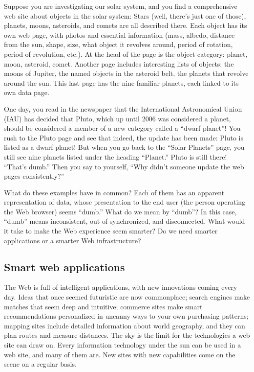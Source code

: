 Suppose you are investigating our solar system, and you find a
comprehensive web site about objects in the solar system: Stars (well,
there's just one of those), planets, moons, asteroids, and comets are
all described there. Each object has its own web page, with photos and
essential information (mass, albedo, distance from the sun, shape, size,
what object it revolves around, period of rotation, period of
revolution, etc.). At the head of the page is the object category:
planet, moon, asteroid, comet. Another page includes interesting lists
of objects: the moons of Jupiter, the named objects in the asteroid
belt, the planets that revolve around the sun. This last page has the
nine familiar planets, each linked to its own data page.

One day, you read in the newspaper that the International Astronomical
Union (IAU) has decided that Pluto, which up until 2006 was considered a
planet, should be considered a member of a new category called a ``dwarf
planet''! You rush to the Pluto page and see that indeed, the update has
been made: Pluto is listed as a dwarf planet! But when you go back to
the ``Solar Planets'' page, you still see nine planets listed under the
heading ``Planet.'' Pluto is still there! ``That's dumb.'' Then you say
to yourself, ``Why didn't someone update the web pages consistently?''

What do these examples have in common? Each of them has an apparent
representation of data, whose presentation to the end user (the person
operating the Web browser) seems ``dumb.'' What do we mean by ``dumb''?
In this case, ``dumb'' means inconsistent, out of synchronized, and
disconnected. What would it take to make the Web experience seem
smarter? Do we need smarter applications or a smarter Web
infrastructure?


\subsection{Smart web applications}

The Web is full of intelligent applications, with new innovations coming
every day. Ideas that once seemed futuristic are now commonplace; search
engines make matches that seem deep and intuitive; commerce sites make
smart recommendations personalized in uncanny ways to your own
purchasing patterns; mapping sites include detailed information about
world geography, and they can plan routes and measure distances. The sky
is the limit for the technologies a web site can draw on. Every
information technology under the sun can be used in a web site, and many
of them are. New sites with new capabilities come on the scene on a
regular basis.

